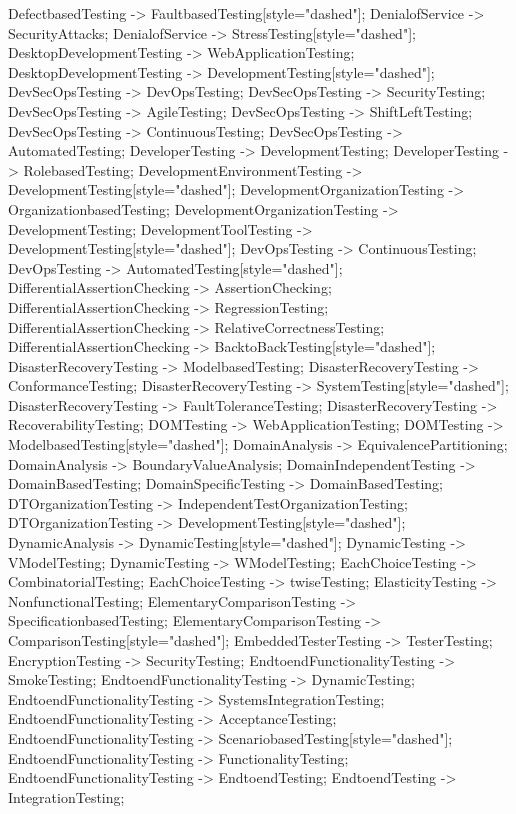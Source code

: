 \documentclass{article}
\begin{document}
{DefectbasedTesting -> FaultbasedTesting[style="dashed"];
DenialofService -> SecurityAttacks;
DenialofService -> StressTesting[style="dashed"];
DesktopDevelopmentTesting -> WebApplicationTesting;
DesktopDevelopmentTesting -> DevelopmentTesting[style="dashed"];
DevSecOpsTesting -> DevOpsTesting;
DevSecOpsTesting -> SecurityTesting;
DevSecOpsTesting -> AgileTesting;
DevSecOpsTesting -> ShiftLeftTesting;
DevSecOpsTesting -> ContinuousTesting;
DevSecOpsTesting -> AutomatedTesting;
DeveloperTesting -> DevelopmentTesting;
DeveloperTesting -> RolebasedTesting;
DevelopmentEnvironmentTesting -> DevelopmentTesting[style="dashed"];
DevelopmentOrganizationTesting -> OrganizationbasedTesting;
DevelopmentOrganizationTesting -> DevelopmentTesting;
DevelopmentToolTesting -> DevelopmentTesting[style="dashed"];
DevOpsTesting -> ContinuousTesting;
DevOpsTesting -> AutomatedTesting[style="dashed"];
DifferentialAssertionChecking -> AssertionChecking;
DifferentialAssertionChecking -> RegressionTesting;
DifferentialAssertionChecking -> RelativeCorrectnessTesting;
DifferentialAssertionChecking -> BacktoBackTesting[style="dashed"];
DisasterRecoveryTesting -> ModelbasedTesting;
DisasterRecoveryTesting -> ConformanceTesting;
DisasterRecoveryTesting -> SystemTesting[style="dashed"];
DisasterRecoveryTesting -> FaultToleranceTesting;
DisasterRecoveryTesting -> RecoverabilityTesting;
DOMTesting -> WebApplicationTesting;
DOMTesting -> ModelbasedTesting[style="dashed"];
DomainAnalysis -> EquivalencePartitioning;
DomainAnalysis -> BoundaryValueAnalysis;
DomainIndependentTesting -> DomainBasedTesting;
DomainSpecificTesting -> DomainBasedTesting;
DTOrganizationTesting -> IndependentTestOrganizationTesting;
DTOrganizationTesting -> DevelopmentTesting[style="dashed"];
DynamicAnalysis -> DynamicTesting[style="dashed"];
DynamicTesting -> VModelTesting;
DynamicTesting -> WModelTesting;
EachChoiceTesting -> CombinatorialTesting;
EachChoiceTesting -> twiseTesting;
ElasticityTesting -> NonfunctionalTesting;
ElementaryComparisonTesting -> SpecificationbasedTesting;
ElementaryComparisonTesting -> ComparisonTesting[style="dashed"];
EmbeddedTesterTesting -> TesterTesting;
EncryptionTesting -> SecurityTesting;
EndtoendFunctionalityTesting -> SmokeTesting;
EndtoendFunctionalityTesting -> DynamicTesting;
EndtoendFunctionalityTesting -> SystemsIntegrationTesting;
EndtoendFunctionalityTesting -> AcceptanceTesting;
EndtoendFunctionalityTesting -> ScenariobasedTesting[style="dashed"];
EndtoendFunctionalityTesting -> FunctionalityTesting;
EndtoendFunctionalityTesting -> EndtoendTesting;
EndtoendTesting -> IntegrationTesting;
}
\end{document}
